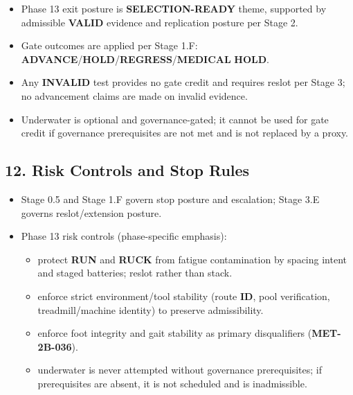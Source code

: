 \documentclass[10pt]{article}
\begin{document}
\begin{itemize}
\item Phase 13 exit posture is \textbf{SELECTION-READY} theme, supported by admissible \textbf{VALID} evidence and replication posture per Stage 2.
\item Gate outcomes are applied per Stage 1.F: \textbf{ADVANCE}/\textbf{HOLD}/\textbf{REGRESS}/\textbf{MEDICAL} \textbf{HOLD}.
\item Any \textbf{INVALID} test provides no gate credit and requires reslot per Stage 3; no advancement claims are made on invalid evidence.
\item Underwater is optional and governance-gated; it cannot be used for gate credit if governance prerequisites are not met and is not replaced by a proxy.
\end{itemize}

\subsection*{12. Risk Controls and Stop Rules}

\begin{itemize}
\item Stage 0.5 and Stage 1.F govern stop posture and escalation; Stage 3.E governs reslot/extension posture.
\item Phase 13 risk controls (phase-specific emphasis):
  \begin{itemize}
  \item protect \textbf{RUN} and \textbf{RUCK} from fatigue contamination by spacing intent and staged batteries; reslot rather than stack.
  \item enforce strict environment/tool stability (route \textbf{ID}, pool verification, treadmill/machine identity) to preserve admissibility.
  \item enforce foot integrity and gait stability as primary disqualifiers (\textbf{MET-2B-036}).
  \item underwater is never attempted without governance prerequisites; if prerequisites are absent, it is not scheduled and is inadmissible.
  \end{itemize}
\end{itemize}
\end{document}
